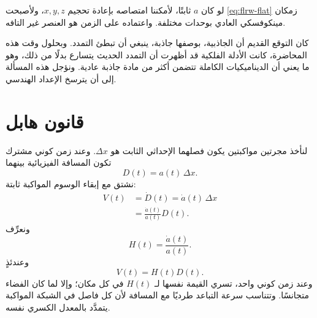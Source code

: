 لو كان \(a\) ثابتًا، لأمكننا امتصاصه بإعادة تحجيم \(x,y,z\)، ولأصبحت \eqref{eq:flrw-flat} زمكان مينكوفسكي العادي بوحدات مختلفة. واعتماده على الزمن هو العنصر غير التافه.

\begin{classroomqa}
\end{classroomqa}

\begin{classroomqa}
\end{classroomqa}

كان التوقع القديم أن الجاذبية، بوصفها جاذبة، ينبغي أن تبطئ التمدد. وبحلول وقت هذه المحاضرة، كانت الأدلة الفلكية قد أظهرت أن التمدد الحديث يتسارع بدلًا من ذلك، وهو ما يعني أن الديناميكيات الكاملة تتضمن أكثر من مادة جاذبة عادية. ونؤجل هذه المسألة إلى أن يترسخ الإعداد الهندسي.

\section{قانون هابل}

لنأخذ مجرتين مواكبتين يكون فصلهما الإحداثي الثابت هو \(\Delta x\). وعند زمن كوني مشترك تكون المسافة الفيزيائية بينهما
\begin{equation}
  D(t)=a(t)\,\Delta x.
  \label{eq:physical-distance}
\end{equation}
نشتق مع إبقاء الوسوم المواكبة ثابتة:
\begin{align}
  V(t)
    &=\dot D(t)
      =\dot a(t)\,\Delta x \nonumber\\
    &=\frac{\dot a(t)}{a(t)}D(t).
  \label{eq:hubble-derivation}
\end{align}
ونعرِّف
\begin{equation}
  H(t)=\frac{\dot a(t)}{a(t)}.
  \label{eq:hubble-parameter}
\end{equation}
وعندئذٍ
\begin{equation}
  V(t)=H(t)D(t).
  \label{eq:hubble-law}
\end{equation}
وعند زمن كوني واحد، تسري القيمة نفسها لـ \(H(t)\) في كل مكان؛ وإلا لما كان الفضاء متجانسًا. وتتناسب سرعة التباعد طرديًا مع المسافة لأن كل فاصل في الشبكة المواكبة يتمدَّد بالمعدل الكسري نفسه.

